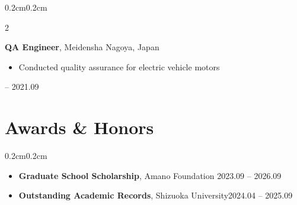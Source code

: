 \documentclass[10pt, letterpaper]{article}
\newenvironment{highlights}{
    \begin{itemize}[
        topsep=0.1cm,
        parsep=0.1cm,
        partopsep=0pt,
        itemsep=0.05cm,
        leftmargin=0.5cm
    ]
}{\end{itemize}}
\newenvironment{highlightsforbulletentries}{
    \begin{itemize}[
        topsep=0.1cm,
        parsep=0.1cm,
        partopsep=0pt,
        itemsep=0.05cm,
        leftmargin=0.4cm
    ]
}{\end{itemize}}
\newenvironment{onecolentry}{
    \begin{adjustwidth}{0.2cm}{0.2cm}
}{\end{adjustwidth}}
\newenvironment{twocolentry}[2][]{
    \onecolentry
    \def\secondColumn{#2}
    \setcolumnwidth{\fill, 3.2cm}
    \begin{paracol}{2}
}{\switchcolumn \raggedleft \secondColumn \end{paracol} \endonecolentry}
\begin{document}
    \begin{twocolentry}{2020.04 – 2021.09}
        \textbf{QA Engineer}, Meidensha \textbar{}   Nagoya, Japan
        \begin{highlights}
            \item Conducted quality assurance for electric vehicle motors
        \end{highlights}
    \end{twocolentry}


    \section{Awards \& Honors}
    \begin{onecolentry}
        \begin{highlightsforbulletentries}
            \item \textbf{Graduate School Scholarship}, Amano Foundation \hfill 2023.09 – 2026.09
            \item \textbf{Outstanding Academic Records}, Shizuoka University\hfill 2024.04 – 2025.09
        \end{highlightsforbulletentries}
    \end{onecolentry}

\end{document}
